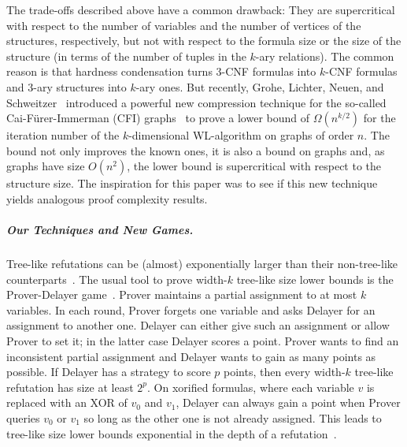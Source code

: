 \documentclass[10pt,a4paper]{article}
\begin{document}
The trade-offs described above have a common drawback:
They are supercritical with respect to the number of variables and the number of vertices of the structures, respectively,
but not with respect to the formula size or the size of the structure (in terms of the number of tuples in the $k$-ary relations). The common reason is that hardness condensation turns $3$-CNF formulas into $k$-CNF formulas and $3$-ary structures into $k$-ary ones.
But recently,  Grohe, Lichter, Neuen, and Schweitzer~\cite{DBLP:conf/focs/GroheLNS23} introduced a powerful new compression technique for the so-called Cai-Fürer-Immerman (CFI) graphs~\cite{CaiFuererImmerman1992} to prove a lower bound of $\Omega(n^{k/2})$
for the iteration number of the $k$-dimensional WL-algorithm on graphs of order $n$.
%
%
%
%
%
The bound not only improves the known ones, it is also a
%
bound
on graphs
%
%
%
%
and, as graphs have size $O(n^2)$, the lower bound is supercritical with
respect to the structure size. 
The inspiration for this paper was to see if this new technique yields analogous proof complexity results. 

\subparagraph*{Our Techniques and New Games.}
Tree-like refutations can be (almost) exponentially larger than their non-tree-like counterparts~\cite{Ben-SassonIW2004}.
The usual tool to prove width-$k$ tree-like size lower bounds is the Prover-Delayer game~\cite{PudlakImpagliazzo2000}.
Prover maintains a partial assignment to at most $k$ variables.
In each round, Prover forgets one variable and asks Delayer for an assignment to another one. Delayer can either give such an assignment or allow Prover to set it; in the latter case Delayer scores a point.
Prover wants to find an inconsistent partial assignment and Delayer wants to gain as many points as possible. If Delayer has a strategy to score $p$ points, then every width-$k$ tree-like refutation has size at least $2^p$.
On xorified formulas, where each variable $v$ is replaced with an XOR of $v_0$ and $v_1$,
Delayer can always gain a point when Prover queries $v_0$ or $v_1$ so long as the other one is not already assigned. 
This leads to tree-like size lower bounds exponential in the depth of a refutation~\cite{Urquhart2011}.
\end{document}
